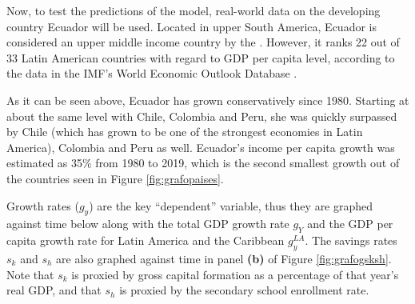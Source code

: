 \documentclass[12pt,twoside,a4paper]{article}
\numberwithin{equation}{section}
\begin{document}
Now, to test the predictions of the model, real-world data on the developing country Ecuador will be used. Located in upper South America, Ecuador is considered an upper middle income country by the \textcite{WorldBankGroup.2019}. However, it ranks 22 out of 33 Latin American countries with regard to GDP per capita level, according to the data in the IMF's World Economic Outlook Database \parencite*{InternationalMonetaryFund.2019}.
\begin{figure}[H]
\end{figure}
As it can be seen above, Ecuador has grown conservatively since 1980. Starting at about the same level with Chile, Colombia and Peru, she was quickly surpassed by Chile (which has grown to be one of the strongest economies in Latin America), Colombia and Peru as well. Ecuador's income per capita growth was estimated as 35\% from 1980 to 2019, which is the second smallest growth out of the countries seen in Figure \ref{fig:grafopaises}.

Growth rates ($g_y$) are the key ``dependent'' variable, thus they are graphed against time below along with the total GDP growth rate $g_Y$ and the GDP per capita growth rate for Latin America and the Caribbean $g_y^{LA}$. The savings rates $s_k$ and $s_h$ are also graphed against time in panel \textbf{(b)} of Figure \ref{fig:grafogsksh}.  Note that $s_k$ is proxied by gross capital formation as a percentage of that year's real GDP, and that $s_h$ is proxied by the secondary school enrollment rate.  
\end{document}
